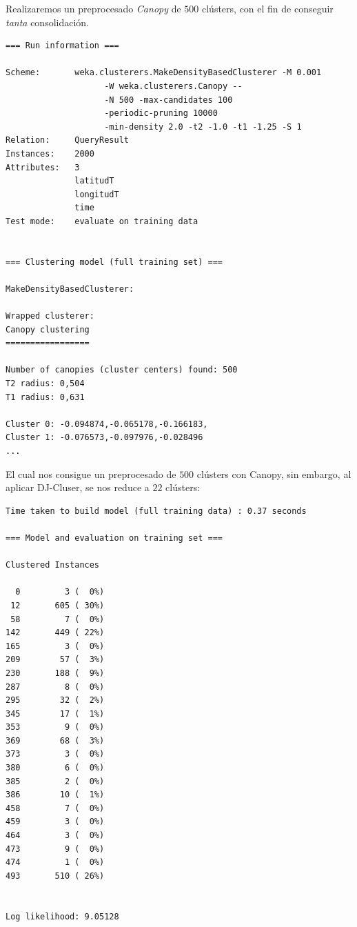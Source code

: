 \documentclass[a4paper, 12pt]{article}
\begin{document}
Realizaremos un preprocesado \textit{Canopy} de $500$ cl\'usters, con el fin de conseguir \textit{tanta} consolidaci\'on.\\

\begin{verbatim}
=== Run information ===

Scheme:       weka.clusterers.MakeDensityBasedClusterer -M 0.001 
					-W weka.clusterers.Canopy -- 
					-N 500 -max-candidates 100 
					-periodic-pruning 10000 
					-min-density 2.0 -t2 -1.0 -t1 -1.25 -S 1
Relation:     QueryResult
Instances:    2000
Attributes:   3
              latitudT
              longitudT
              time
Test mode:    evaluate on training data


=== Clustering model (full training set) ===

MakeDensityBasedClusterer: 

Wrapped clusterer: 
Canopy clustering
=================

Number of canopies (cluster centers) found: 500
T2 radius: 0,504     
T1 radius: 0,631     

Cluster 0: -0.094874,-0.065178,-0.166183,
Cluster 1: -0.076573,-0.097976,-0.028496
...
\end{verbatim}

El cual nos consigue un preprocesado de $500$ cl\'usters con Canopy, sin embargo, al aplicar DJ-Cluser, se nos reduce a $22$ cl\'usters:\\

\begin{verbatim}
Time taken to build model (full training data) : 0.37 seconds

=== Model and evaluation on training set ===

Clustered Instances

  0         3 (  0%)
 12       605 ( 30%)
 58         7 (  0%)
142       449 ( 22%)
165         3 (  0%)
209        57 (  3%)
230       188 (  9%)
287         8 (  0%)
295        32 (  2%)
345        17 (  1%)
353         9 (  0%)
369        68 (  3%)
373         3 (  0%)
380         6 (  0%)
385         2 (  0%)
386        10 (  1%)
458         7 (  0%)
459         3 (  0%)
464         3 (  0%)
473         9 (  0%)
474         1 (  0%)
493       510 ( 26%)


Log likelihood: 9.05128
\end{verbatim}
\end{document}
